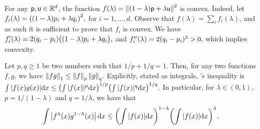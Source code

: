 \begin{tedium}
    For any $\mathsf{p}, \mathsf{u} \in \mathbb{R}^d$, the function
    $f(\lambda) =\left\| { (1-\lambda)\mathsf{p} + \lambda \mathsf{u}} \right\|^2$ is
    convex. Indeed, let
    \begin{math}
        f_i(\lambda) = \pth{ (1-\lambda)\pntCoord_i + \lambda
           \pntCoordA_i}^2,
    \end{math}
    for $i=1,\ldots, d$. Observe that
    $f(\lambda) = \sum_i f_i(\lambda)$, and as such it is sufficient
    to prove that $f_i$ is convex. We have
    \begin{math}
        f_i'(\lambda) = 2(\pntCoordA_i - \pntCoord_i)\pth{\bigl.
           (1-\lambda)\pntCoord_i + \lambda \pntCoordA_i},
    \end{math}
    and
    \begin{math}
        f_i''(\lambda) = 2(q_i - p_i)^2 > 0,
    \end{math}
    which implies convexity.
\end{tedium}

\begin{fact}
    Let $p,q \geq 1$ be two numbers such that $1/p+1/q=1$. Then, for
    any two functions $f,g$, we have
    $\left\| {fg} \right\|_1 \leq \left\| {f} \right\|_p \left\| {g} \right\|_q$. Explicitly, stated as
    integrals, \Holder's inequality is
    \begin{math}
        \int |f(x) g(x)| \mathrm{d} x \leq \pth{\int |f(x)|^p
           \mathrm{d} x}^{1/p} \pth{\int |f(x)|^q \mathrm{d} x}^{1/q}.
    \end{math}
    In particular, 
    for $\lambda \in (0,1)$, $p=1/(1-\lambda)$ and $q=1/\lambda$, we
    have that
    \begin{equation}
        \int \cardin{f^\lambda (x) g^{1-\lambda}(x)} \mathrm{d} x%
        \leq%
        \pth{\int |f(x)|
           \mathrm{d} x}^{1-\lambda} \pth{\int |f(x)| \mathrm{d}
           x}^{\lambda}.
        \eqlab{holder:var}
    \end{equation}
\end{fact}

